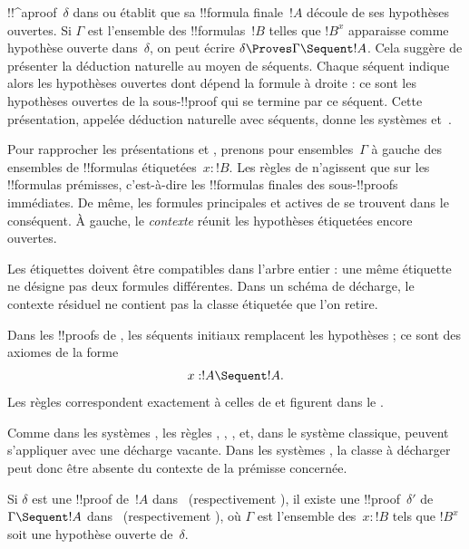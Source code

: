 \documentclass[../../../include/open-logic-section]{subfiles}
\begin{document}


!!^a{proof}~$\delta$ dans  ou  établit
que sa !!{formula} finale~$!A$ découle de ses hypothèses
ouvertes. Si $\Gamma$ est l'ensemble des !!{formula}s~$!B$
telles que $!B^x$ apparaisse comme hypothèse ouverte
dans~$\delta$, on peut écrire $\delta \Proves \Gamma
\Sequent !A$. Cela suggère de présenter la déduction
naturelle au moyen de séquents. Chaque séquent indique
alors les hypothèses ouvertes dont dépend la formule
à droite : ce sont les hypothèses ouvertes de la
sous-!!{proof} qui se termine par ce séquent. Cette
présentation, appelée déduction naturelle avec séquents,
donne les systèmes  et~.

Pour rapprocher les présentations  et ,
prenons pour ensembles~$\Gamma$ à gauche des ensembles de
!!{formula}s étiquetées~$x:!B$. Les règles de 
n'agissent que sur les !!{formula}s prémisses, c'est-à-dire
les !!{formula}s finales des sous-!!{proof}s immédiates.
De même, les formules principales et actives de 
se trouvent dans le conséquent. À gauche, le \emph{contexte}
réunit les hypothèses étiquetées encore ouvertes.

Les étiquettes doivent être compatibles dans l'arbre entier :
une même étiquette ne désigne pas deux formules différentes.
Dans un schéma de décharge, le contexte résiduel ne
contient pas la classe étiquetée que l'on retire.

Dans les !!{proof}s de , les séquents initiaux
remplacent les hypothèses ; ce sont des axiomes de la forme
\[x:!A \Sequent !A.\]
Les règles correspondent exactement à celles de 
et figurent dans le .



Comme dans les systèmes , les règles
\Intro{\lif}, \Intro{\lnot}, \Elim{\lor}, \Elim{\lexists}
et, dans le système classique, \FalseCl peuvent s'appliquer
avec une décharge vacante. Dans les systèmes ,
la classe à décharger peut donc être absente du contexte
de la prémisse concernée.



\begin{prop}
Si $\delta$ est une !!{proof} de~$!A$ dans~
(respectivement ), il existe une
!!{proof}~$\delta'$ de $\Gamma \Sequent !A$ dans~
(respectivement ), où $\Gamma$ est l'ensemble
des~$x:!B$ tels que $!B^x$ soit une hypothèse ouverte
de~$\delta$.
\end{prop}
\end{document}

